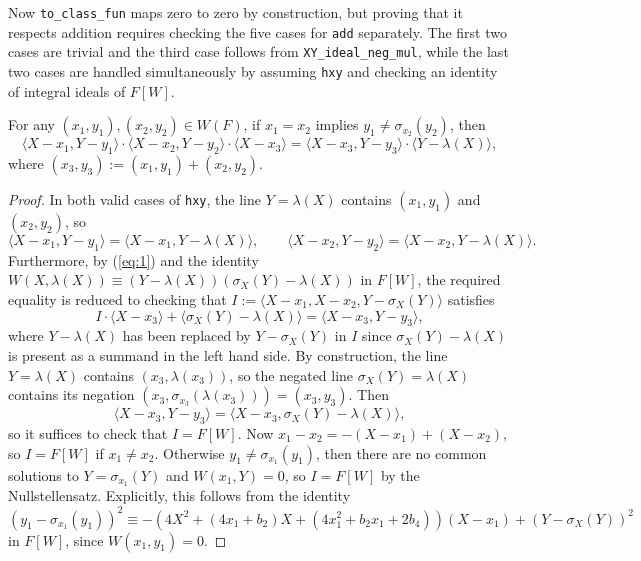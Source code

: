 \documentclass[a4paper,UKenglish,cleveref,autoref,thm-restate]{lipics-v2021}
\begin{document}
\pagebreak

Now \texttt{to\_class\_fun} maps zero to zero by construction, but proving that it respects addition requires checking the five cases for \texttt{add} separately. The first two cases are trivial and the third case follows from \texttt{XY\_ideal\_neg\_mul}, while the last two cases are handled simultaneously by assuming \texttt{hxy} and checking an identity of integral ideals of $ F[W] $.

\begin{lemma}
\label{lem:XY_ideal_mul_XY_ideal}
For any $ (x_1, y_1), (x_2, y_2) \in W(F) $, if $ x_1 = x_2 $ implies $ y_1 \ne \sigma_{x_2}(y_2) $, then
\[ \langle X - x_1, Y - y_1 \rangle \cdot \langle X - x_2, Y - y_2 \rangle \cdot \langle X - x_3 \rangle = \langle X - x_3, Y - y_3 \rangle \cdot \langle Y - \lambda(X) \rangle, \]
where $ (x_3, y_3) := (x_1, y_1) + (x_2, y_2) $.
\end{lemma}

\begin{proof}
In both valid cases of \texttt{hxy}, the line $ Y = \lambda(X) $ contains $ (x_1, y_1) $ and $ (x_2, y_2) $, so
\[ \langle X - x_1, Y - y_1 \rangle = \langle X - x_1, Y - \lambda(X) \rangle, \qquad \langle X - x_2, Y - y_2 \rangle = \langle X - x_2, Y - \lambda(X) \rangle. \]
Furthermore, by (\ref{eq:1}) and the identity $ W(X, \lambda(X)) \equiv (Y - \lambda(X))(\sigma_X(Y) - \lambda(X)) $ in $ F[W] $, the required equality is reduced to checking that $ I := \langle X - x_1, X - x_2, Y - \sigma_X(Y) \rangle $ satisfies
\[ I \cdot \langle X - x_3 \rangle + \langle \sigma_X(Y) - \lambda(X) \rangle = \langle X - x_3, Y - y_3 \rangle, \]
where $ Y - \lambda(X) $ has been replaced by $ Y - \sigma_X(Y) $ in $ I $ since $ \sigma_X(Y) - \lambda(X) $ is present as a summand in the left hand side. By construction, the line $ Y = \lambda(X) $ contains $ (x_3, \lambda(x_3)) $, so the negated line $ \sigma_X(Y) = \lambda(X) $ contains its negation $ (x_3, \sigma_{x_3}(\lambda(x_3))) = (x_3, y_3) $. Then
\[ \langle X - x_3, Y - y_3 \rangle = \langle X - x_3, \sigma_X(Y) - \lambda(X) \rangle, \]
so it suffices to check that $ I = F[W] $. Now $ x_1 - x_2 = -(X - x_1) + (X - x_2) $, so $ I = F[W] $ if $ x_1 \ne x_2 $. Otherwise $ y_1 \ne \sigma_{x_1}(y_1) $, then there are no common solutions to $ Y = \sigma_{x_1}(Y) $ and $ W(x_1, Y) = 0 $, so $ I = F[W] $ by the Nullstellensatz. Explicitly, this follows from the identity
\[ (y_1 - \sigma_{x_1}(y_1))^2 \equiv -(4X^2 + (4x_1 + b_2)X + (4x_1^2 + b_2x_1 + 2b_4))(X - x_1) + (Y - \sigma_X(Y))^2 \]
in $ F[W] $, since $ W(x_1, y_1) = 0 $.
\end{proof}
\end{document}

